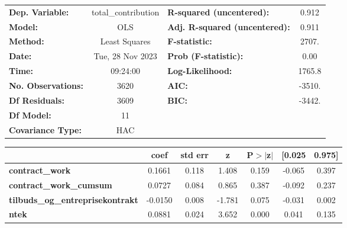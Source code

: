 \begin{center}
\begin{tabular}{lclc}
\toprule
\textbf{Dep. Variable:}                  & total\_contribution & \textbf{  R-squared (uncentered):}      &     0.912   \\
\textbf{Model:}                          &         OLS         & \textbf{  Adj. R-squared (uncentered):} &     0.911   \\
\textbf{Method:}                         &    Least Squares    & \textbf{  F-statistic:       }          &     2707.   \\
\textbf{Date:}                           &   Tue, 28 Nov 2023  & \textbf{  Prob (F-statistic):}          &     0.00    \\
\textbf{Time:}                           &       09:24:00      & \textbf{  Log-Likelihood:    }          &    1765.8   \\
\textbf{No. Observations:}               &          3620       & \textbf{  AIC:               }          &    -3510.   \\
\textbf{Df Residuals:}                   &          3609       & \textbf{  BIC:               }          &    -3442.   \\
\textbf{Df Model:}                       &            11       & \textbf{                     }          &             \\
\textbf{Covariance Type:}                &         HAC         & \textbf{                     }          &             \\
\bottomrule
\end{tabular}
\begin{tabular}{lcccccc}
                                         & \textbf{coef} & \textbf{std err} & \textbf{z} & \textbf{P$> |$z$|$} & \textbf{[0.025} & \textbf{0.975]}  \\
\midrule
\textbf{contract\_work}                  &       0.1661  &        0.118     &     1.408  &         0.159        &       -0.065    &        0.397     \\
\textbf{contract\_work\_cumsum}          &       0.0727  &        0.084     &     0.865  &         0.387        &       -0.092    &        0.237     \\
\textbf{tilbuds\_og\_entreprisekontrakt} &      -0.0150  &        0.008     &    -1.781  &         0.075        &       -0.031    &        0.002     \\
\textbf{ntek}                            &       0.0881  &        0.024     &     3.652  &         0.000        &        0.041    &        0.135     \\

\end{tabular}
\end{center}

